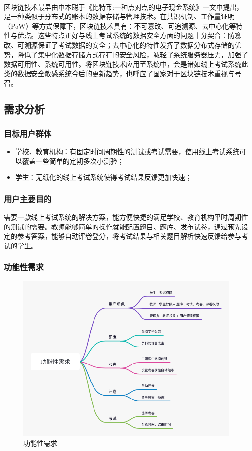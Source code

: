 区块链技术最早由中本聪于《比特币:一种点对点的电子现金系统》\textsuperscript{\cite{ref0}}一文中提出，是一种类似于分布式的账本的数据存储与管理技术。在共识机制、工作量证明（PoW）等方式保障下，区块链技术具有：不可篡改、可追溯源、去中心化等特性与优点。这些特点正好与线上考试系统的数据安全方面的问题十分契合：防篡改、可溯源保证了考试数据的安全；去中心化的特性发挥了数据分布式存储的优势，降低了集中化数据存储方式存在的安全风险，减轻了系统服务器压力，加强了数据可用性、系统可用性。将区块链技术应用至系统中，会是诸如线上考试系统此类的数据安全敏感系统今后的更新趋势，也呼应了国家对于区块链技术重视与号召。


\subsection{需求分析}
\subsubsection{目标用户群体}
\begin{itemize}
    \item 学校、教育机构：有固定时间周期性的测试或考试需要，使用线上考试系统可以覆盖一些简单的定期多次小测验；
    \item 学生：无纸化的线上考试系统使得考试结果反馈更加快速；
\end{itemize}

\subsubsection{用户主要目的}
需要一款线上考试系统的解决方案，能方便快捷的满足学校、教育机构平时周期性的测试的需要。教师能够简单的操作就能配置题目、题库、发布试卷，通过预先设定的参考答案，能够自动评卷登分，将考试结果与相关题目解析快速反馈给参与考试的学生。

\subsubsection{功能性需求}
\begin{figure}[htb!]
    \centering
    \includegraphics[width=0.8\linewidth]{_images/功能性需求.png}
    \caption{功能性需求}
    \label{功能性需求}
\end{figure}
